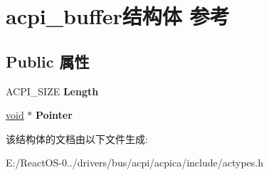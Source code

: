 \hypertarget{structacpi__buffer}{}\section{acpi\+\_\+buffer结构体 参考}
\label{structacpi__buffer}
\subsection*{Public 属性}
\begin{DoxyCompactItemize}
\item 
\mbox{\label{structacpi__buffer_ae7c06f2850a47879d14be25a906d2c22}} 
A\+C\+P\+I\+\_\+\+S\+I\+ZE {\bfseries Length}
\item 
\mbox{\label{structacpi__buffer_a34493648116b5c7e52c02b9e67b08e00}} 
\hyperlink{interfacevoid}{void} $\ast$ {\bfseries Pointer}
\end{DoxyCompactItemize}


该结构体的文档由以下文件生成\+:\begin{DoxyCompactItemize}
\item 
E\+:/\+React\+O\+S-\/0../drivers/bus/acpi/acpica/include/actypes.\+h\end{DoxyCompactItemize}
